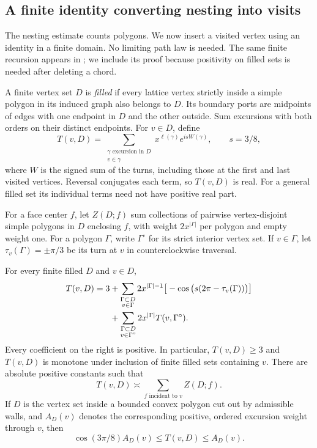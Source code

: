 \subsection{A finite identity converting nesting into visits}
\label{sec:finite-visits}
The nesting estimate counts polygons.  We now insert a visited vertex
using an identity in a finite domain.  No limiting path law is needed. The same finite recursion appears in
\cite[Proposition~8.1]{PolynomialVacuumCompanion}; we include its proof
because positivity on filled sets is needed after deleting a chord.

A finite vertex set $D$ is \emph{filled} if every lattice vertex strictly
inside a simple polygon in its induced graph also belongs to $D$.
Its boundary ports are midpoints of edges with one endpoint in $D$ and
the other outside.  Sum excursions with both orders on their distinct
endpoints.  For $v\in D$, define
\[
 T(v,D)=\sum_{\substack{\gamma\text{ excursion in }D\\v\in\gamma}}
       x^{\ell(\gamma)}e^{isW(\gamma)},\qquad s=3/8,
\]
where $W$ is the signed sum of the turns, including those at the first
and last visited vertices.  Reversal conjugates each term, so $T(v,D)$
is real.  For a general filled set its individual terms need not have
positive real part.

For a face center $f$, let $Z(D;f)$ sum collections of pairwise
vertex-disjoint simple polygons in $D$ enclosing $f$, with weight
$2x^{|\Gamma|}$ per polygon and empty weight one.  For a polygon $\Gamma$,
write $\Gamma^\circ$ for its strict interior vertex set.  If $v\in\Gamma$,
let $\tau_v(\Gamma)=\pm\pi/3$ be its turn at $v$ in counterclockwise
traversal.

\begin{proposition}
\label{prop:visits}
For every finite filled $D$ and $v\in D$,
\begin{align}
T(v,D)=3
 &+\sum_{\substack{\Gamma\subset D\\v\in\Gamma}}
       2x^{|\Gamma|-1}\big[-\cos\big(s(2\pi-\tau_v(\Gamma))\big)\big]
 \notag\\
 &+\sum_{\substack{\Gamma\subset D\\v\in\Gamma^\circ}}
       2x^{|\Gamma|}T(v,\Gamma^\circ).                 \label{c2:eq-G2}
\end{align}
Every coefficient on the right is positive.  In particular, $T(v,D)\ge3$
and $T(v,D)$ is monotone under inclusion of finite filled sets containing
$v$.  There are absolute positive constants such that
\begin{equation}
 T(v,D)\asymp\sum_{f\text{ incident to }v}Z(D;f).       \label{c2:eq-G3}
\end{equation}
If $D$ is the vertex set inside a bounded convex polygon cut out by
admissible walls, and $A_D(v)$ denotes the corresponding positive,
ordered excursion weight through $v$, then
\begin{equation}
 \cos(3\pi/8)A_D(v)\le T(v,D)\le A_D(v).              \label{eq:positive-visits}
\end{equation}
\end{proposition}

